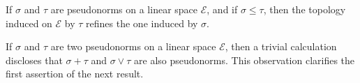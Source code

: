 If $\sigma$ and $\tau$ are pseudonorms on a linear space $\mathcal{E}$, and if $\sigma \leq \tau$, then the topology induced on $\mathcal{E}$ by $\tau$ refines the one induced by $\sigma$.

If $\sigma$ and $\tau$ are two pseudonorms on a linear space $\mathcal{E}$, then a trivial calculation discloses that $\sigma + \tau$ and $\sigma \vee \tau$ are also pseudonorms. This observation clarifies the first assertion of the next result.
